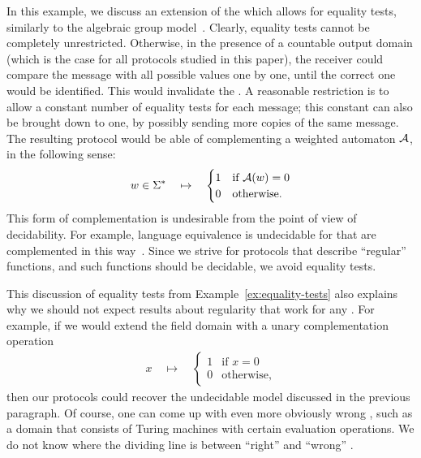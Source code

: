 \begin{myexample}
\label{ex:equality-tests}
In this example, we discuss an extension of the  which allows for
equality tests, similarly to the algebraic group
model~\cite{fuchsbauer2018algebraic}. Clearly, equality tests cannot be
completely unrestricted. Otherwise, in the presence of a countable output
domain (which is the case for all protocols studied in this paper), the
receiver could compare the message with all possible values one by one, until
the correct one would be identified. This would  invalidate the . A reasonable restriction is to allow a constant number of equality
tests for each message; this constant can also be brought down to one, by
possibly sending more copies of the same message. The resulting protocol would
be able of complementing a weighted automaton ${\mathcal A}$, in the following sense:
\begin{align*}
w \in \Sigma^* 
\quad \mapsto \quad 
\begin{cases}
    1 & \text{if ${\mathcal A}(w) =0$}\\
    0 & \text{otherwise}.
\end{cases}
\end{align*}
This form of complementation is undesirable from the point of view of decidability. For example, language equivalence is undecidable for  that are complemented in this way~\cite[Theorem 4.9]{bojanczyk_automata_2025}. 
Since we strive for protocols that describe ``regular'' functions, and such functions should be decidable, we avoid equality tests.
\end{myexample}

\begin{myexample}\label{ex:wrong-output-domains}
 This discussion of equality tests from Example~\ref{ex:equality-tests} also
 explains why we should not expect results about regularity that work for any
 . For example, if we would extend the field domain with a unary
 complementation operation 
 \begin{align*}
 x 
 \quad \mapsto \quad 
 \begin{cases}
    1 & \text{if $x =0$}\\
    0 & \text{otherwise},
\end{cases}
 \end{align*}
 then our protocols could recover the undecidable model discussed in the
 previous paragraph.  Of course, one can come up with even more obviously wrong
 , such as a domain that consists of Turing machines with certain
 evaluation operations. We do not know where the dividing line is between
 ``right'' and ``wrong'' .
\end{myexample}


